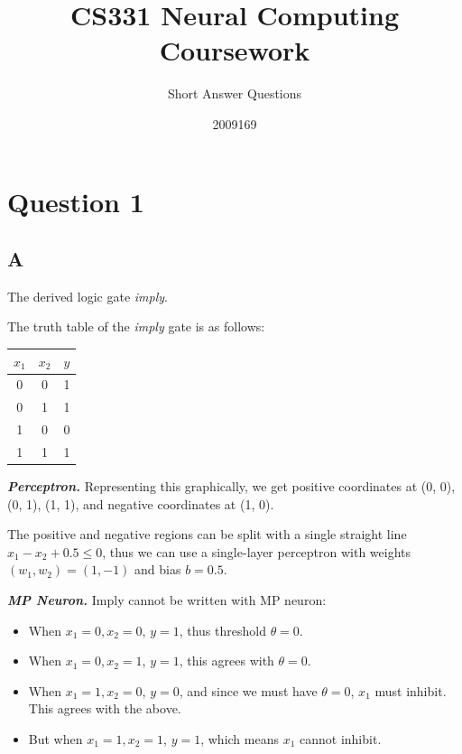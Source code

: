 \documentclass{article}
\title{CS331 Neural Computing Coursework}
\author{Short Answer Questions}
\date{2009169}
\begin{document}
\maketitle
\thispagestyle{fancy}

\section*{Question 1}

\subsection*{A}

The derived logic gate \textit{imply}.

The truth table of the \textit{imply} gate is as follows:

\begin{center}
   \begin{tabular}{cc|c}
      $x_1$ & $x_2$ & $y$ \\
      \hline
      0 & 0 & 1\\
      0 & 1 & 1\\
      1 & 0 & 0\\
      1 & 1 & 1
   \end{tabular}
\end{center}

\textbf{\textit{Perceptron.}} Representing this graphically, we get positive coordinates at (0, 0), (0, 1), (1, 1), and negative coordinates at (1, 0).

The positive and negative regions can be split with a single straight line $x_1 - x_2 + 0.5 \leq 0$, thus we can use a single-layer perceptron with weights $(w_1, w_2) = (1, -1)$ and bias $b = 0.5$. \bigskip

\textbf{\textit{MP Neuron.}} Imply cannot be written with MP neuron:

\begin{itemize}
   \item When $x_1 = 0, x_2 = 0$, $y = 1$, thus threshold $\theta = 0$.
   \item When $x_1 = 0, x_2 = 1$, $y=1$, this agrees with $\theta = 0$.
   \item When $x_1 = 1, x_2 = 0$, $y = 0$, and since we must have $\theta = 0$, $x_1$ must inhibit. This agrees with the above.
   \item But when $x_1=1, x_2=1$, $y=1$, which means $x_1$ cannot inhibit.
\end{itemize}
\end{document}
